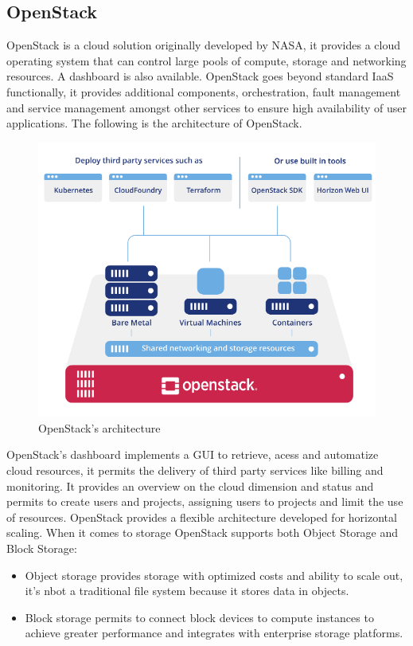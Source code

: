 \subsection{OpenStack}
OpenStack is a cloud solution originally developed by NASA, it provides a cloud operating system that can control large pools of compute, storage and networking resources. A dashboard is also available. \n
OpenStack goes beyond standard IaaS functionally, it provides additional components, orchestration, fault management and service management amongst other services to ensure high availability of user applications. The following is the architecture of OpenStack.
\begin{figure}
    \centering
    \includegraphics[scale=0.6]{Images/OpenStack.png}
    \caption{OpenStack's architecture}
\end{figure}
OpenStack's dashboard implements a GUI to retrieve, acess and automatize cloud resources, it permits the delivery of third party services like billing and monitoring. It provides an overview on the cloud dimension and status and permits to create users and projects, assigning users to projects and limit the use of resources. OpenStack provides a flexible architecture developed for horizontal scaling. \n
When it comes to storage OpenStack supports both Object Storage and Block Storage:
\begin{itemize}
    \item Object storage provides storage with optimized costs and ability to scale out, it's nbot a traditional file system because it stores data in objects.
    \item Block storage permits to connect block devices to compute instances to achieve greater performance and integrates with enterprise storage platforms.
\end{itemize}
